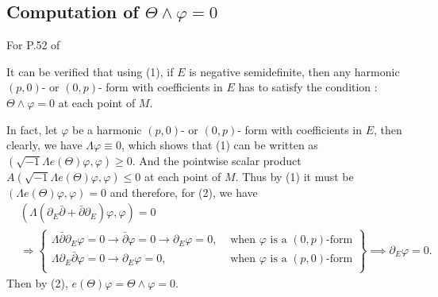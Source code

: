 \documentclass[lang=en,12pt]{beautybook}
\begin{document}
\subsection{Computation of \texorpdfstring{$\Theta\wedge\varphi=0$}{}}
For P.52 of \cite{gigante1981vector}
\begin{fancybox}
  It can be verified that using (1), if $E$ is negative semidefinite, then any harmonic $(p,0)$- or $(0,p)$- form with coefficients in $E$ has to satisfy the condition : $\Theta\wedge\varphi=0$ at each point of $M$.
\end{fancybox}
In fact, let $\varphi$ be a harmonic $(p,0)$- or $(0,p)$- form with coefficients in $E$, then clearly, we have $\Lambda\varphi\equiv 0$, which shows that (1) can be written as $(\sqrt{-1}\Lambda e(\Theta)\varphi,\varphi)\geqslant 0$. And the pointwise scalar product $A(\sqrt{-1}\Lambda e(\Theta)\varphi,\varphi)\leqslant 0$ at each point of $M$. Thus by (1) it must be $(\Lambda e(\Theta)\varphi,\varphi)=0$ and therefore, for (2), we have
\begin{align*}
   & (\Lambda(\partial_E \bar{\partial}+\bar{\partial}\partial_E)\varphi,\varphi)=0                                                                                               \\
   & \Longrightarrow \left.\begin{cases}
                             \Lambda\bar{\partial}\partial_E\varphi=0\rightarrow \bar{\partial}\varphi=0\rightarrow \partial_E\varphi=0, & \text{ when $\varphi$ is a $(0,p)$-form} \\
                             \Lambda\partial_E \bar{\partial}\varphi=0\rightarrow \partial_E\varphi=0,                                   & \text{ when $\varphi$ is a $(p,0)$-form} \\
                           \end{cases}\right\}\implies \partial_E\varphi=0.
\end{align*}
Then by (2), $e(\Theta)\varphi=\Theta\wedge\varphi=0$.
\end{document}
